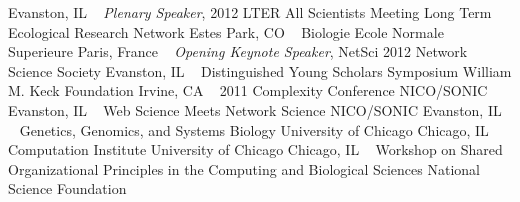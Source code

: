     \newline
Evanston, IL
\newline
~
\Gap
{}
\textit{Plenary Speaker}, 2012 LTER All Scientists Meeting
\newline
    Long Term Ecological Research Network
    \newline
Estes Park, CO
\newline
~
\Gap
{}
Biologie
\newline
    Ecole Normale Superieure
    \newline
Paris, France
\newline
~
\Gap
{}
\textit{Opening Keynote Speaker}, NetSci 2012
\newline
    Network Science Society
    \newline
Evanston, IL
\newline
~
\Gap
{}
Distinguished Young Scholars Symposium
\newline
    William M. Keck Foundation
    \newline
Irvine, CA
\newline
~
\Gap
{}
2011 Complexity Conference
\newline
    NICO/SONIC 
    \newline
Evanston, IL
\newline
~
\Gap
{}
Web Science Meets Network Science
\newline
    NICO/SONIC 
    \newline
Evanston, IL
\newline
~
\Gap
{}
Genetics, Genomics, and Systems Biology
\newline
    University of Chicago
    \newline
Chicago, IL
\newline
~
\Gap
{}
Computation Institute
\newline
    University of Chicago
    \newline
Chicago, IL
\newline
~
\Gap
{}
Workshop on Shared Organizational Principles in the Computing and Biological Sciences
\newline
    National Science Foundation
    \newline
